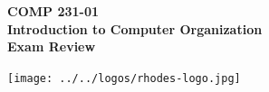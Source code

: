 \documentclass[10pt]{article}
\begin{document}

\hspace{-5mm}
\begin{minipage}{0.65\linewidth}
  \textbf{
      \hspace{-3mm}
      {\Large COMP 231-01}\\
      {\Large Introduction to Computer Organization}\\
      {\Large Exam Review}}
\end{minipage}
\begin{minipage}{0.35\linewidth}
  \texttt{[image: ../../logos/rhodes-logo.jpg]}
\end{minipage}

\end{document}
